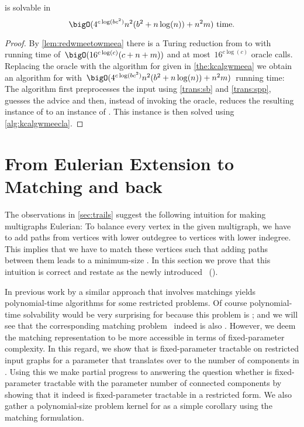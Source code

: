 \begin{corollary}\label{cor:wmeefptbc}
  \pWMEE{} is solvable in~\[\bigO(4^{c\log(bc^2)}n^2(b^2 + n\log(n)) + n^2m) \text{ time.}\]
\end{corollary}
\begin{proof}
  By \autoref{lem:redwmeetowmeea} there is a Turing reduction from \pWMEEs{} to \pWMEECAs{} with running time of~$\bigO(16^{c\log(c)}(c + n + m))$ and at most~$16^{c\log(c)}$ oracle calls. Replacing the oracle with the algorithm for \pWMEECAs{} given in \autoref{the:kcalgwmeea} we obtain an algorithm for \pWMEEs{} with~$\bigO(4^{c\log(bc^2)}n^2(b^2 + n\log(n)) + n^2m)$~running time: The algorithm first preprocesses the input using \autoref{trans:sb} and \autoref{trans:spp}, guesses the advice and then, instead of invoking the oracle, reduces the resulting instance of \pWMEECAs{} to an instance of \pWMEECCLAs{}. This instance is then solved using \autoref{alg:kcalgwmeecla}.
\end{proof}



\section{From Eulerian Extension to Matching and back}\label{sec:matching}

The observations in \autoref{sec:trails} suggest the following intuition for making multigraphs Eulerian: To balance every vertex in the given multigraph, we have to add paths from vertices with lower outdegree to vertices with lower indegree. This implies that we have to match these vertices such that adding paths between them leads to a minimum-size \EE. In this section we prove that this intuition is correct and restate \pWMEEs{} as the newly introduced \pCBM{}~(\pCBMs{}).

In previous work by \citet{DMNW10} a similar approach that involves matchings yields polynomial-time algorithms for some restricted \EE{} problems. Of course polynomial-time solvability would be very surprising for \pWMEEs{} because this problem is \NPh ; and we will see that the corresponding matching problem~\pCBMs{} indeed is also \NPh . However, we deem the matching representation to be more accessible in terms of fixed-parameter complexity. In this regard, we show that \pCBMs{} is fixed-parameter tractable on restricted input graphs for a parameter that translates over to the number of components in \pWMEEs{}. Using this we make partial progress to answering the question whether \pWMEEs{} is fixed-parameter tractable with the parameter number of connected components by showing that it indeed is fixed-parameter tractable in a restricted form. We also gather a polynomial-size problem kernel for \pWMEECAs{} as a simple corollary using the matching formulation.

